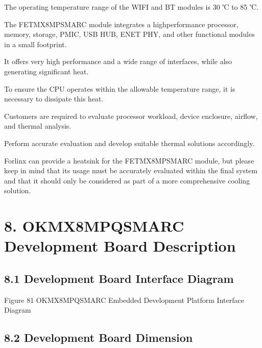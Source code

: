 \documentclass[letterpaper,10pt,openany,english]{sphinxmanual}
\begin{document}
\sphinxAtStartPar
The operating temperature range of the WIFI and BT modules is \sphinxhyphen{}30 ℃ to 85 ℃.

\sphinxAtStartPar
The FET\sphinxhyphen{}MX8MP\sphinxhyphen{}SMARC module integrates a high\sphinxhyphen{}performance processor, memory, storage, PMIC, USB HUB, ENET PHY, and other functional modules in a small footprint.

\sphinxAtStartPar
It offers very high performance and a wide range of interfaces, while also generating significant heat.

\sphinxAtStartPar
To ensure the CPU operates within the allowable temperature range, it is necessary to dissipate this heat.

\sphinxAtStartPar
Customers are required to evaluate processor workload, device enclosure, airflow, and thermal analysis.

\sphinxAtStartPar
Perform accurate evaluation and develop suitable thermal solutions accordingly.

\sphinxAtStartPar
Forlinx can provide a heatsink for the FET\sphinxhyphen{}MX8MP\sphinxhyphen{}SMARC module, but please keep in mind that its usage must be accurately evaluated within the final system and that it should only be considered as part of a more comprehensive cooling solution.


\chapter{8. OK\sphinxhyphen{}MX8MPQ\sphinxhyphen{}SMARC Development Board Description}
\label{\detokenize{hardware:ok-mx8mpq-smarc-development-board-description}}

\section{8.1 Development Board Interface Diagram}
\label{\detokenize{hardware:development-board-interface-diagram}}
\sphinxAtStartPar
{}

\sphinxAtStartPar
Figure 8\sphinxhyphen{}1  OK\sphinxhyphen{}MX8MPQ\sphinxhyphen{}SMARC Embedded Development Platform Interface Diagram


\section{8.2 Development Board Dimension}
\label{\detokenize{hardware:development-board-dimension}}
\sphinxAtStartPar
{}
\end{document}
